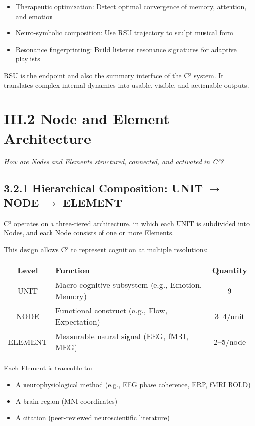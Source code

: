\documentclass[10pt]{article}
\begin{document}
\begin{itemize}
    \item Therapeutic optimization: Detect optimal convergence of memory, attention, and emotion
    \item Neuro-symbolic composition: Use RSU trajectory to sculpt musical form
    \item Resonance fingerprinting: Build listener resonance signatures for adaptive playlists
\end{itemize}

RSU is the endpoint and also the summary interface of the C³ system. It translates complex internal dynamics into usable, visible, and actionable outputs.

\section*{III.2 Node and Element Architecture}

\textit{How are Nodes and Elements structured, connected, and activated in C³?}

\subsection*{3.2.1 Hierarchical Composition: UNIT $\rightarrow$ NODE $\rightarrow$ ELEMENT}

C³ operates on a three-tiered architecture, in which each UNIT is subdivided into Nodes, and each Node consists of one or more Elements.

This design allows C³ to represent cognition at multiple resolutions:

\begin{center}
\begin{tabular}{|c|l|c|}
\hline
\textbf{Level} & \textbf{Function} & \textbf{Quantity} \\
\hline
UNIT & Macro cognitive subsystem (e.g., Emotion, Memory) & 9 \\
NODE & Functional construct (e.g., Flow, Expectation) & 3–4/unit \\
ELEMENT & Measurable neural signal (EEG, fMRI, MEG) & 2–5/node \\
\hline
\end{tabular}
\end{center}

Each Element is traceable to:

\begin{itemize}
    \item A neurophysiological method (e.g., EEG phase coherence, ERP, fMRI BOLD)
    \item A brain region (MNI coordinates)
    \item A citation (peer-reviewed neuroscientific literature)
\end{itemize}
\end{document}
